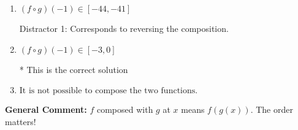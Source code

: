 \documentclass{extbook}[14pt]
\begin{document}
\begin{enumerate}
{\begin{enumerate}[label=\Alph*.]
 Distractor 2: Corresponds to being slightly off from the solution.
\item \( (f \circ g)(-1) \in [-44, -41] \)

 Distractor 1: Corresponds to reversing the composition.
\item \( (f \circ g)(-1) \in [-3, 0] \)

* This is the correct solution
\item \( \text{It is not possible to compose the two functions.} \)


\end{enumerate}

\textbf{General Comment:} $f$ composed with $g$ at $x$ means $f(g(x))$. The order matters!
}
\end{enumerate}
\end{document}
